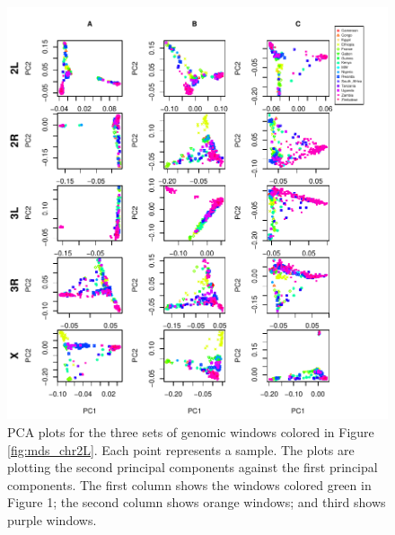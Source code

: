 \documentclass[11pt, oneside]{article}   	%
\begin{document}
\begin{figure}
    \begin{center}
       \includegraphics{Fig2_pca_plots_allchr_3peaks_byMDS}
    \end{center}
    \caption{      
        PCA plots for the three sets of genomic windows colored in Figure \ref{fig:mds_chr2L}. 
        Each point represents a sample. 
        The plots are plotting the second principal components against the first principal components. 
        The first column shows the windows colored green in Figure 1; the second column shows orange windows; and third shows purple windows.
         \label{fig:pca_chr2L}
    }
\end{figure}
\end{document}
